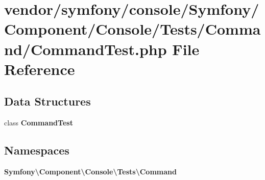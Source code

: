 \section{vendor/symfony/console/\+Symfony/\+Component/\+Console/\+Tests/\+Command/\+Command\+Test.php File Reference}
\label{_command_test_8php}
\subsection*{Data Structures}
\begin{DoxyCompactItemize}
\item 
class {\bf Command\+Test}
\end{DoxyCompactItemize}
\subsection*{Namespaces}
\begin{DoxyCompactItemize}
\item 
 {\bf Symfony\textbackslash{}\+Component\textbackslash{}\+Console\textbackslash{}\+Tests\textbackslash{}\+Command}
\end{DoxyCompactItemize}
